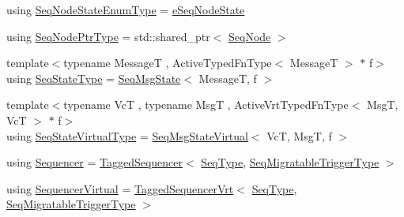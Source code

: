 \begin{DoxyCompactItemize}
\item 
using \hyperlink{namespacevt_1_1seq_afe6bbf714bc77696f189e9321b981e46}{Seq\+Node\+State\+Enum\+Type} = \hyperlink{namespacevt_1_1seq_ad7b0496818667d816e00f717491d3b92}{e\+Seq\+Node\+State}
\item 
using \hyperlink{namespacevt_1_1seq_ae6a4874b585be0612aaca32ca6d2d191}{Seq\+Node\+Ptr\+Type} = std\+::shared\+\_\+ptr$<$ \hyperlink{structvt_1_1seq_1_1_seq_node}{Seq\+Node} $>$
\item 
{\footnotesize template$<$typename MessageT , Active\+Typed\+Fn\+Type$<$ Message\+T $>$ $\ast$ f$>$ }\\using \hyperlink{namespacevt_1_1seq_a61d50713160a2f94f2f2b22eb68eb12e}{Seq\+State\+Type} = \hyperlink{structvt_1_1seq_1_1_seq_msg_state}{Seq\+Msg\+State}$<$ MessageT, f $>$
\item 
{\footnotesize template$<$typename VcT , typename MsgT , Active\+Vrt\+Typed\+Fn\+Type$<$ Msg\+T, Vc\+T $>$ $\ast$ f$>$ }\\using \hyperlink{namespacevt_1_1seq_a724782ea7be9de5901b428738083ea51}{Seq\+State\+Virtual\+Type} = \hyperlink{structvt_1_1seq_1_1_seq_msg_state_virtual}{Seq\+Msg\+State\+Virtual}$<$ VcT, MsgT, f $>$
\item 
using \hyperlink{namespacevt_1_1seq_a3036b47f9709f15f8a873c5c6b6b7db1}{Sequencer} = \hyperlink{structvt_1_1seq_1_1_tagged_sequencer}{Tagged\+Sequencer}$<$ \hyperlink{namespacevt_1_1seq_a3b612da217ac669d39c159f134ab8434}{Seq\+Type}, \hyperlink{namespacevt_1_1seq_aab252d92ce46371ce1b307eeb524f030}{Seq\+Migratable\+Trigger\+Type} $>$
\item 
using \hyperlink{namespacevt_1_1seq_a2fa3e09bce83c402f60291f7197253ec}{Sequencer\+Virtual} = \hyperlink{structvt_1_1seq_1_1_tagged_sequencer_vrt}{Tagged\+Sequencer\+Vrt}$<$ \hyperlink{namespacevt_1_1seq_a3b612da217ac669d39c159f134ab8434}{Seq\+Type}, \hyperlink{namespacevt_1_1seq_aab252d92ce46371ce1b307eeb524f030}{Seq\+Migratable\+Trigger\+Type} $>$
\end{DoxyCompactItemize}
